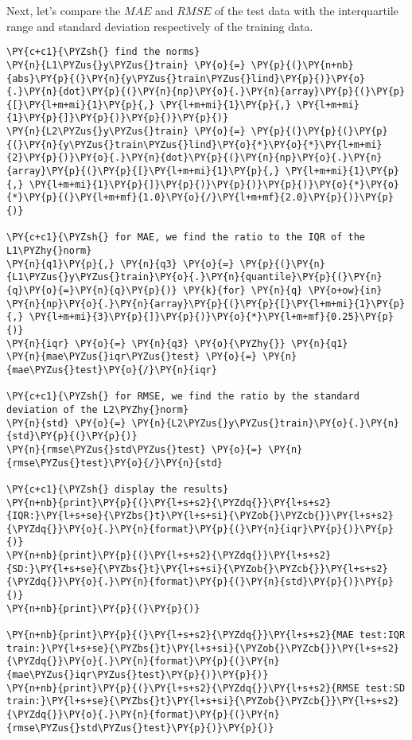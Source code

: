     Next, let's compare the \(M\!A\!E\) and \(R\!M\!S\!E\) of the test data
with the interquartile range and standard deviation respectively of the
training data.

    \begin{tcolorbox}[breakable, size=fbox, boxrule=1pt, pad at break*=1mm,colback=cellbackground, colframe=cellborder]
\begin{Verbatim}[commandchars=\\\{\}]
\PY{c+c1}{\PYZsh{} find the norms}
\PY{n}{L1\PYZus{}y\PYZus{}train} \PY{o}{=} \PY{p}{(}\PY{n+nb}{abs}\PY{p}{(}\PY{n}{y\PYZus{}train\PYZus{}lind}\PY{p}{)}\PY{o}{.}\PY{n}{dot}\PY{p}{(}\PY{n}{np}\PY{o}{.}\PY{n}{array}\PY{p}{(}\PY{p}{[}\PY{l+m+mi}{1}\PY{p}{,} \PY{l+m+mi}{1}\PY{p}{,} \PY{l+m+mi}{1}\PY{p}{]}\PY{p}{)}\PY{p}{)}\PY{p}{)}
\PY{n}{L2\PYZus{}y\PYZus{}train} \PY{o}{=} \PY{p}{(}\PY{p}{(}\PY{p}{(}\PY{n}{y\PYZus{}train\PYZus{}lind}\PY{o}{*}\PY{o}{*}\PY{l+m+mi}{2}\PY{p}{)}\PY{o}{.}\PY{n}{dot}\PY{p}{(}\PY{n}{np}\PY{o}{.}\PY{n}{array}\PY{p}{(}\PY{p}{[}\PY{l+m+mi}{1}\PY{p}{,} \PY{l+m+mi}{1}\PY{p}{,} \PY{l+m+mi}{1}\PY{p}{]}\PY{p}{)}\PY{p}{)}\PY{p}{)}\PY{o}{*}\PY{o}{*}\PY{p}{(}\PY{l+m+mf}{1.0}\PY{o}{/}\PY{l+m+mf}{2.0}\PY{p}{)}\PY{p}{)}

\PY{c+c1}{\PYZsh{} for MAE, we find the ratio to the IQR of the L1\PYZhy{}norm}
\PY{n}{q1}\PY{p}{,} \PY{n}{q3} \PY{o}{=} \PY{p}{(}\PY{n}{L1\PYZus{}y\PYZus{}train}\PY{o}{.}\PY{n}{quantile}\PY{p}{(}\PY{n}{q}\PY{o}{=}\PY{n}{q}\PY{p}{)} \PY{k}{for} \PY{n}{q} \PY{o+ow}{in} \PY{n}{np}\PY{o}{.}\PY{n}{array}\PY{p}{(}\PY{p}{[}\PY{l+m+mi}{1}\PY{p}{,} \PY{l+m+mi}{3}\PY{p}{]}\PY{p}{)}\PY{o}{*}\PY{l+m+mf}{0.25}\PY{p}{)}
\PY{n}{iqr} \PY{o}{=} \PY{n}{q3} \PY{o}{\PYZhy{}} \PY{n}{q1}
\PY{n}{mae\PYZus{}iqr\PYZus{}test} \PY{o}{=} \PY{n}{mae\PYZus{}test}\PY{o}{/}\PY{n}{iqr}

\PY{c+c1}{\PYZsh{} for RMSE, we find the ratio by the standard deviation of the L2\PYZhy{}norm}
\PY{n}{std} \PY{o}{=} \PY{n}{L2\PYZus{}y\PYZus{}train}\PY{o}{.}\PY{n}{std}\PY{p}{(}\PY{p}{)}
\PY{n}{rmse\PYZus{}std\PYZus{}test} \PY{o}{=} \PY{n}{rmse\PYZus{}test}\PY{o}{/}\PY{n}{std}

\PY{c+c1}{\PYZsh{} display the results}
\PY{n+nb}{print}\PY{p}{(}\PY{l+s+s2}{\PYZdq{}}\PY{l+s+s2}{IQR:}\PY{l+s+se}{\PYZbs{}t}\PY{l+s+si}{\PYZob{}\PYZcb{}}\PY{l+s+s2}{\PYZdq{}}\PY{o}{.}\PY{n}{format}\PY{p}{(}\PY{n}{iqr}\PY{p}{)}\PY{p}{)}
\PY{n+nb}{print}\PY{p}{(}\PY{l+s+s2}{\PYZdq{}}\PY{l+s+s2}{SD:}\PY{l+s+se}{\PYZbs{}t}\PY{l+s+si}{\PYZob{}\PYZcb{}}\PY{l+s+s2}{\PYZdq{}}\PY{o}{.}\PY{n}{format}\PY{p}{(}\PY{n}{std}\PY{p}{)}\PY{p}{)}
\PY{n+nb}{print}\PY{p}{(}\PY{p}{)}

\PY{n+nb}{print}\PY{p}{(}\PY{l+s+s2}{\PYZdq{}}\PY{l+s+s2}{MAE test:IQR train:}\PY{l+s+se}{\PYZbs{}t}\PY{l+s+si}{\PYZob{}\PYZcb{}}\PY{l+s+s2}{\PYZdq{}}\PY{o}{.}\PY{n}{format}\PY{p}{(}\PY{n}{mae\PYZus{}iqr\PYZus{}test}\PY{p}{)}\PY{p}{)}
\PY{n+nb}{print}\PY{p}{(}\PY{l+s+s2}{\PYZdq{}}\PY{l+s+s2}{RMSE test:SD train:}\PY{l+s+se}{\PYZbs{}t}\PY{l+s+si}{\PYZob{}\PYZcb{}}\PY{l+s+s2}{\PYZdq{}}\PY{o}{.}\PY{n}{format}\PY{p}{(}\PY{n}{rmse\PYZus{}std\PYZus{}test}\PY{p}{)}\PY{p}{)}
\end{Verbatim}
\end{tcolorbox}

